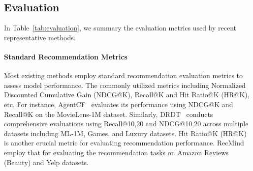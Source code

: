 \subsection{Evaluation}

In Table~\ref{tab:evaluation}, we summary the evaluation metrics used by recent representative methods.

\begin{table*}
\centering
{}
\centering
\caption{Summary of Used Evaluation Metrics.}
\label{tab:evaluation}
\end{table*}

\paragraph{Standard Recommendation Metrics} Most existing methods employ standard recommendation evaluation metrics to assess model performance. The commonly utilized metrics including Normalized Discounted Cumulative Gain (NDCG@K), Recall@K and Hit Ratio@K (HR@K), etc.
For instance, AgentCF~\cite{zhang2024agentcf} evaluates its performance using NDCG@K and Recall@K on the MovieLens-1M dataset. 
Similarly, DRDT~\cite{wang2023drdt} conducts comprehensive evaluations using Recall@{10,20} and NDCG@{10,20} across multiple datasets including ML-1M, Games, and Luxury datasets.
Hit Ratio@K (HR@K) is another crucial metric for evaluating recommendation performance.
RecMind~\cite{wang2024recmind} employ that for evaluating the recommendation tasks on Amazon Reviews (Beauty) and Yelp datasets.


